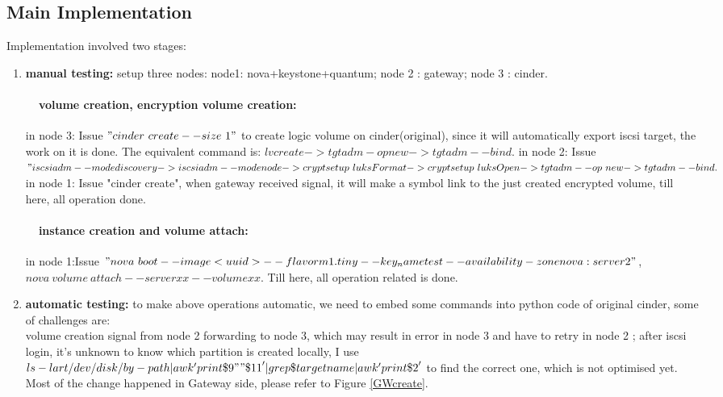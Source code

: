 \documentclass[10pt]{report}
\begin{document}
			\subsection{Main Implementation}
			Implementation involved two stages: 
			\begin{enumerate}[$\bullet$]
			
			\item 
			\textbf{manual testing:} setup three nodes: node1: nova+keystone+quantum; node 2 : gateway; node 3 : cinder.
			\paragraph {\ \ volume creation, encryption volume creation:}
			in node 3: Issue $"cinder\ create --size\ 1"$ to create logic volume on cinder(original), since it will automatically export iscsi target, the work on it is done. The equivalent command is:
			$lvcreate ->  tgtadm -op new ->  tgtadm --bind.$
			in node 2: Issue $" iscsiadm --mode discovery -> iscsiadm --mode node -> cryptsetup\ luksFormat -> cryptsetup\ luksOpen -> tgtadm --op\ new -> tgtadm --bind .$
			in node 1: Issue "cinder create", when gateway received signal, it will make a symbol link to the just created encrypted volume, till here, all operation done.
			\paragraph {\ \ instance creation and volume attach:}
			in node 1:Issue $"nova\ boot --image <uuid> --flavor m1.tiny --key_name test --availability-zone nova:server2"$, $nova\ volume\ attach --server xx --volume xx$. Till here, all operation related is done.
			\item 
			\textbf{automatic testing:}
			to make above operations automatic, we need to embed some commands into python code of original cinder, some of challenges are: \\ volume creation signal from node 2 forwarding to node 3, which may result in error in node 3 and have to retry in node 2 ; after iscsi login, it's unknown to know which partition is created locally, I use $ls -lart /dev/disk/by-path | awk '{print \$9 " " \$11}' | grep \$targetname | awk '{ print \$2 }'  $ to find the correct one, which is not optimised yet.\\
			Most of the change happened in Gateway side, please refer to Figure \ref{GWcreate}.
			
			\end{enumerate}
\end{document}

